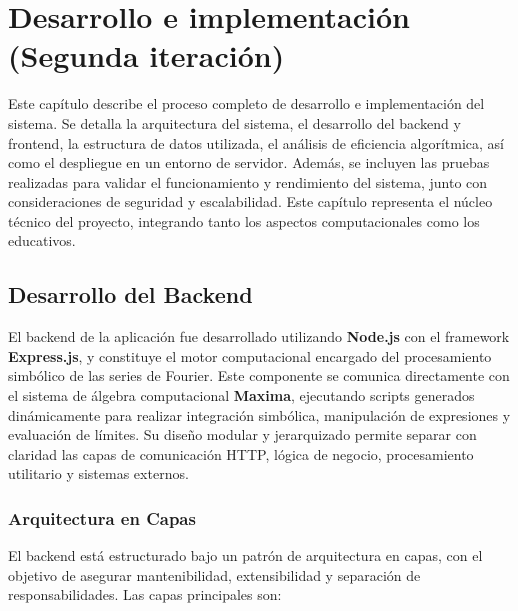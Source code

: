\chapter{Desarrollo e implementación \newline (Segunda iteración)}\label{ch:conclusiones-trabajo-a-futuro}
Este capítulo describe el proceso completo de desarrollo e implementación del sistema. Se detalla la arquitectura del sistema, el desarrollo del backend y frontend, la estructura de datos utilizada, el análisis de eficiencia algorítmica, así como el despliegue en un entorno de servidor. Además, se incluyen las pruebas realizadas para validar el funcionamiento y rendimiento del sistema, junto con consideraciones de seguridad y escalabilidad. Este capítulo representa el núcleo técnico del proyecto, integrando tanto los aspectos computacionales como los educativos.

\section{Desarrollo del Backend}
\label{sec:backend-desarrollo}

El backend de la aplicación fue desarrollado utilizando \textbf{Node.js} con el framework \textbf{Express.js}, y constituye el motor computacional encargado del procesamiento simbólico de las series de Fourier. Este componente se comunica directamente con el sistema de álgebra computacional \textbf{Maxima}, ejecutando scripts generados dinámicamente para realizar integración simbólica, manipulación de expresiones y evaluación de límites. Su diseño modular y jerarquizado permite separar con claridad las capas de comunicación HTTP, lógica de negocio, procesamiento utilitario y sistemas externos.

\subsection{Arquitectura en Capas}

El backend está estructurado bajo un patrón de arquitectura en capas, con el objetivo de asegurar mantenibilidad, extensibilidad y separación de responsabilidades. Las capas principales son:


